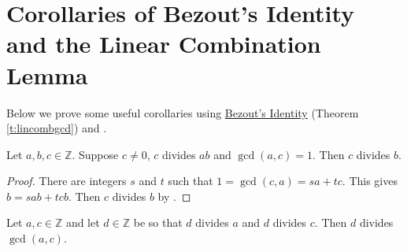 \documentclass[11pt,dvipsnames]{book}
\def\Z{\mathbb{Z}}
\numberwithin{figure}{section} %
\numberwithin{table}{section} %
\begin{document}

%


\section{Corollaries of Bezout's Identity and the Linear Combination Lemma}

Below we prove some useful corollaries using  \hyperref[t:lincombgcd]{ Bezout's Identity} (Theorem \ref{t:lincombgcd}) and \easylemma.

 \begin{corollary}
 \label{c:c|abc|b}
 Let $a,b,c\in\Z$. Suppose $c\neq
0$, $c$ divides $ab$ and $\gcd(a,c)=1$. Then $c$ divides $b$.
\end{corollary}

\begin{proof}
There are integers $s$ and $t$ such that $1=\gcd(c,a)=sa+tc$. This gives $b=sab+tcb$.  Then $c$ divides $b$ by \easylemma .
 \end{proof}

\begin{corollary} Let $a,c\in\Z$ and let $d\in\mathbb{Z}$ be so that $d$ divides $a$ and $d$ divides $c$.  Then $d$ divides $\gcd(a,c)$.
\end{corollary}
\end{document}
